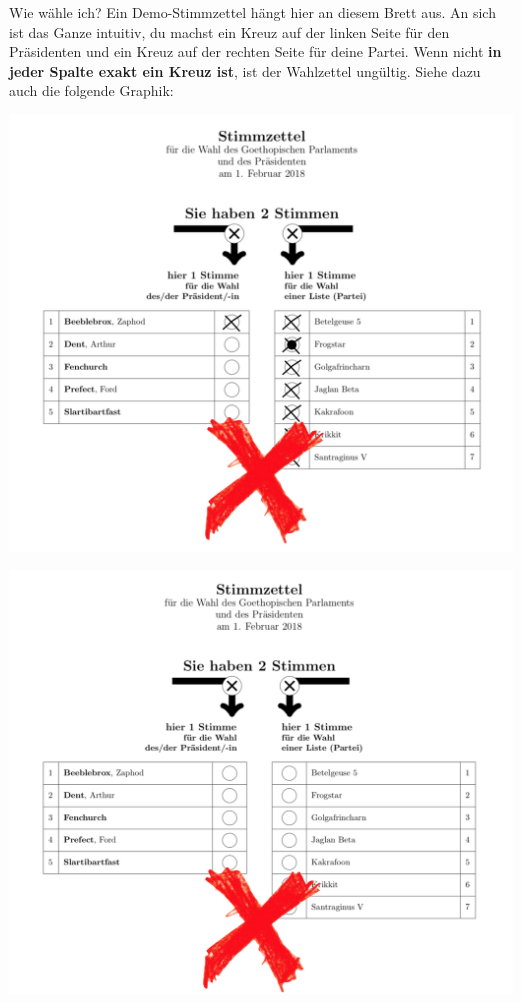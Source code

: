\documentclass{sasbase}
\begin{document}
\begin{question}{Wie wähle ich?}
    Ein Demo-Stimmzettel hängt hier an diesem Brett aus. An sich ist das Ganze intuitiv, du machst ein Kreuz auf der linken Seite für
    den Präsidenten und ein Kreuz auf der rechten Seite für deine Partei. 
    Wenn nicht \textbf{in jeder Spalte exakt ein Kreuz ist}, ist der Wahlzettel ungültig.
    Siehe dazu auch die folgende Graphik:\\
    \begin{minipage}{0.5\linewidth}
    \includegraphics[width=\textwidth]{falsch_1.png}
    \end{minipage}
    \begin{minipage}{0.5\linewidth}
    \includegraphics[width=\textwidth]{falsch_2.png}

\end{minipage}
\end{question}
\end{document}
